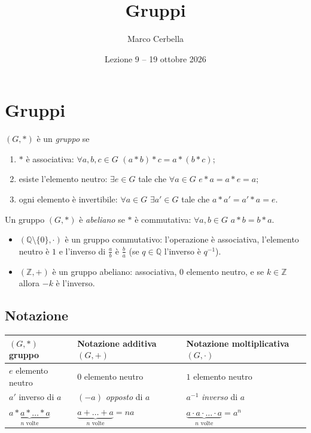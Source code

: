 \documentclass[11pt,a4paper]{article}
\title{Gruppi}
\author{Marco Cerbella}
\date{Lezione 9 -- 19 ottobre 2026}
\begin{document}
\maketitle

\section{Gruppi}

\begin{definizione}
$(G, *)$ è un \emph{gruppo} se
\begin{enumerate}
  \item $*$ è associativa: $\forall a, b, c \in G$ \quad $(a * b) * c = a * (b * c)$;
  \item esiste l'elemento neutro: $\exists e \in G$ tale che $\forall a \in G$ \quad $e * a = a * e = a$;
  \item ogni elemento è invertibile: $\forall a \in G$ \quad $\exists a' \in G$ tale che $a * a' = a' * a = e$.
\end{enumerate}
Un gruppo $(G, *)$ è \emph{abeliano} se $*$ è commutativa: $\forall a, b \in G$ \quad $a * b = b * a$.
\end{definizione}

\begin{esempio}
\begin{itemize}
  \item $(\mathbb{Q}\setminus\{0\}, \cdot)$ è un gruppo commutativo: l'operazione è associativa, l'elemento neutro è $1$ e l'inverso di $\frac{a}{b}$ è $\frac{b}{a}$ (se $q \in \mathbb{Q}$ l'inverso è $q^{-1}$).
  \item $(\mathbb{Z}, +)$ è un gruppo abeliano: associativa, $0$ elemento neutro, e se $k \in \mathbb{Z}$ allora $-k$ è l'inverso.
\end{itemize}
\end{esempio}

\subsection{Notazione}

\begin{center}
\begin{tabular}{@{}p{3.5cm} p{4.5cm} p{4.5cm}@{}}
\toprule
$(G, *)$ gruppo & Notazione additiva $(G, +)$ & Notazione moltiplicativa $(G, \cdot)$ \\
\midrule
$e$ elemento neutro & $0$ elemento neutro & $1$ elemento neutro \\[2pt]
$a'$ inverso di $a$ & $(-a)$ \emph{opposto} di $a$ & $a^{-1}$ \emph{inverso} di $a$ \\[2pt]
$\underbrace{a * a * \dots * a}_{n\text{ volte}}$ & $\underbrace{a + \dots + a}_{n\text{ volte}} = na$ & $\underbrace{a \cdot a \cdot \ldots \cdot a}_{n\text{ volte}} = a^n$ \\
\bottomrule
\end{tabular}
\end{center}
\end{document}
